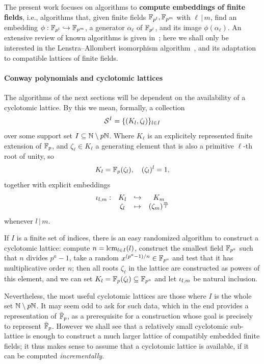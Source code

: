 \documentclass{sig-alternate}
\begin{document}
The present work focuses on algorithms to \textbf{compute embeddings
  of finite fields}, i.e., algorithms that, given finite fields
$\mathbb{F}_{p^l},\mathbb{F}_{p^m}$ with $\ell\,|\,m$, find an embedding
$\phi:\mathbb{F}_{p^l}\hookrightarrow\mathbb{F}_{p^m}$, a generator $\alpha_\ell$
of $\mathbb{F}_{p^l}$, and its image $\phi(\alpha_\ell)$. %
An extensive review of known algorithms is given
in~\cite{brieulle2018computing}; here we shall only be interested in
the Lenstra--Allombert isomorphism
algorithm~\cite{LenstraJr91,Allombert02}, and its adaptation to
compatible lattices of finite fields.


\paragraph{Conway polynomials and cyclotomic lattices}
The algorithms of the next sections will be dependent on the
availability of a cyclotomic lattice. %
By this we mean, formally, a collection
\[ \mathcal{S}^{I}=\{(K_l,\zeta_l)\}_{l\in I} \]
over some support set $I\subseteq\mathbb{N}\setminus p\mathbb{N}$.
Where $K_\ell$ is an explicitely represented finite extension of $\mathbb{F}_p$,
and $\zeta_\ell\in K_\ell$ a generating element that is also a primitive $\ell$-th root
of unity,
so \[ K_l=\mathbb{F}_p(\zeta_l),\quad(\zeta_l)^l=1, \]
together with
explicit embeddings
\[
\begin{array}{cccc}
  {\iota_{{l},{m}}}: & K_l & \hookrightarrow & K_m \\
  & \zeta_l & \mapsto & (\zeta_{m})^{\frac{m}{l}}
\end{array}
\]
whenever $l\,|\,m$.

If $I$ is a finite set of indices, there is an easy randomized
algorithm to construct a cyclotomic lattice: compute
$n=\operatorname{lcm}_{l\in I}(l)$, construct the smallest field $\mathbb{F}_{p^a}$ such
that $n$ divides $p^a-1$, take a random $x^{(p^a-1)/n}\in\mathbb{F}_{p^a}$ and
test that it has multiplicative order $n$;
then all roots $\zeta_\ell$ in the
lattice are constructed as powers of this element,
and we can set $K_l=\mathbb{F}_p(\zeta_l)\subseteq\mathbb{F}_{p^a}$
and let ${\iota_{{l},{m}}}$ be natural inclusion.

Nevertheless, the most useful cyclotomic lattices are those where $I$
is the whole set $\mathbb{N}\setminus p\mathbb{N}$.
It may seem odd to ask for such data, which in the end provides a representation of $\bar{\mathbb{F}}_p$,
as a prerequisite for a construction whose goal is precisely to represent $\bar{\mathbb{F}}_p$.
However we shall see that a relatively small cyclotomic sub-lattice is
enough to construct a much larger lattice of compatibly embedded
finite fields; it thus makes sense to assume that a cyclotomic lattice
is available, if it can be computed \emph{incrementally}.
\end{document}
